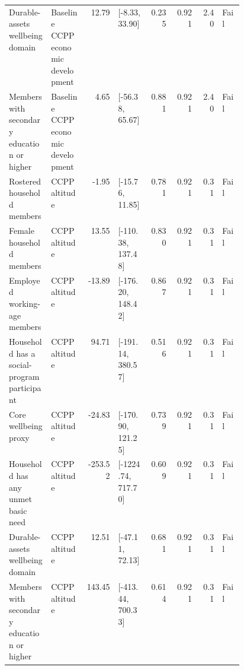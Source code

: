 \begin{longtable}{@{}p{0.18\linewidth}p{0.15\linewidth}rp{0.13\linewidth}rrrl@{}}
Durable-assets wellbeing domain & Baseline CCPP economic development & 12.79 & [-8.33, 33.90] & 0.235 & 0.921 & 2.40 & Fail \\
Members with secondary education or higher & Baseline CCPP economic development & 4.65 & [-56.38, 65.67] & 0.881 & 0.921 & 2.40 & Fail \\
Rostered household members & CCPP altitude & -1.95 & [-15.76, 11.85] & 0.781 & 0.921 & 0.31 & Fail \\
Female household members & CCPP altitude & 13.55 & [-110.38, 137.48] & 0.830 & 0.921 & 0.31 & Fail \\
Employed working-age members & CCPP altitude & -13.89 & [-176.20, 148.42] & 0.867 & 0.921 & 0.31 & Fail \\
Household has a social-program participant & CCPP altitude & 94.71 & [-191.14, 380.57] & 0.516 & 0.921 & 0.31 & Fail \\
Core wellbeing proxy & CCPP altitude & -24.83 & [-170.90, 121.25] & 0.739 & 0.921 & 0.31 & Fail \\
Household has any unmet basic need & CCPP altitude & -253.52 & [-1224.74, 717.70] & 0.609 & 0.921 & 0.31 & Fail \\
Durable-assets wellbeing domain & CCPP altitude & 12.51 & [-47.11, 72.13] & 0.681 & 0.921 & 0.31 & Fail \\
Members with secondary education or higher & CCPP altitude & 143.45 & [-413.44, 700.33] & 0.614 & 0.921 & 0.31 & Fail \\
\end{longtable}
\endgroup
